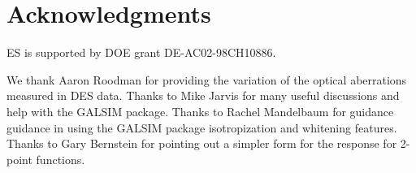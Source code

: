 \documentclass[a4paper,fleqn,usenatbib]{mnras}
\newcommand{\rgsim}{\texttt{RG}}
\begin{document}

\section*{Acknowledgments}

ES is supported by DOE grant DE-AC02-98CH10886.

We thank Aaron Roodman for providing the variation of the optical aberrations
measured in DES data.  Thanks to Mike Jarvis for many useful discussions and
help with the GALSIM package.  Thanks to Rachel Mandelbaum for guidance
guidance in using the GALSIM package isotropization and whitening features.
Thanks to Gary Bernstein for pointing out a simpler form for the response for
2-point functions.
\end{document}
